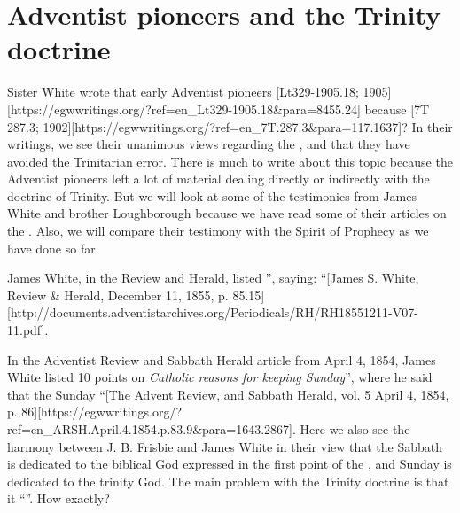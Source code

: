 \chapter{Adventist pioneers and the Trinity doctrine}

Sister White wrote that early Adventist pioneers [Lt329-1905.18; 1905][https://egwwritings.org/?ref=en\_Lt329-1905.18&para=8455.24] because [7T 287.3; 1902][https://egwwritings.org/?ref=en\_7T.287.3&para=117.1637]? In their writings, we see their unanimous views regarding the , and that they have avoided the Trinitarian error. There is much to write about this topic because the Adventist pioneers left a lot of material dealing directly or indirectly with the doctrine of Trinity. But we will look at some of the testimonies from James White and brother Loughborough because we have read some of their articles on the . Also, we will compare their testimony with the Spirit of Prophecy as we have done so far.

James White, in the Review and Herald, listed ”, saying: “[James S. White, Review \& Herald, December 11, 1855, p. 85.15][http://documents.adventistarchives.org/Periodicals/RH/RH18551211-V07-11.pdf].

In the Adventist Review and Sabbath Herald article from April 4, 1854, James White listed 10 points on \textit{Catholic reasons for keeping Sunday}”, where he said that the Sunday “[The Advent Review, and Sabbath Herald, vol. 5 April 4, 1854, p. 86][https://egwwritings.org/?ref=en\_ARSH.April.4.1854.p.83.9&para=1643.2867]. Here we also see the harmony between J. B. Frisbie and James White in their view that the Sabbath is dedicated to the biblical God expressed in the first point of the , and Sunday is dedicated to the trinity God. The main problem with the Trinity doctrine is that it “”. How exactly?

